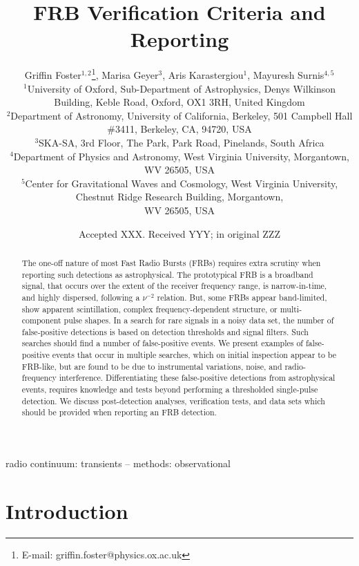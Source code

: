 \documentclass[a4paper,fleqn,usenatbib]{mnras}
\title[FRB Verification Criteria and Reporting]{FRB Verification Criteria and Reporting}
\author[G. Foster et al.]{
Griffin Foster$^{1,2}$\thanks{E-mail: griffin.foster@physics.ox.ac.uk},
Marisa Geyer$^{3}$,
Aris Karastergiou$^{1}$,
Mayuresh Surnis$^{4,5}$
\\
$^{1}$University of Oxford, Sub-Department of Astrophysics, Denys Wilkinson Building, Keble Road, Oxford, OX1 3RH, United Kingdom\\
$^{2}$Department of Astronomy, University of California, Berkeley, 501 Campbell
Hall \#3411, Berkeley, CA, 94720, USA\\
$^{3}$SKA-SA, 3rd Floor, The Park, Park Road, Pinelands, South Africa\\
$^{4}$Department of Physics and Astronomy, West Virginia University, Morgantown, WV 26505, USA\\
$^{5}$Center for Gravitational Waves and Cosmology, West Virginia University, Chestnut Ridge Research Building, Morgantown,\\ WV 26505, USA\\
}
\date{Accepted XXX. Received YYY; in original ZZZ}
\begin{document}
\label{firstpage}
\pagerange{\pageref{firstpage}--\pageref{lastpage}}
\maketitle

\begin{abstract}
The one-off nature of most Fast Radio Bursts (FRBs) requires extra scrutiny when
reporting such detections as astrophysical.  The prototypical FRB is a broadband
signal, that occurs over the extent of the receiver frequency range, is
narrow-in-time, and highly dispersed, following a $\nu^{-2}$ relation.  But,
some FRBs appear band-limited, show apparent scintillation, complex
frequency-dependent structure, or multi-component pulse shapes.  In a search for
rare signals in a noisy data set, the number of false-positive detections is
based on detection thresholds and signal filters.  Such searches should find a
number of false-positive events.  We present examples of false-positive events
that occur in multiple searches, which on initial inspection appear to be
FRB-like, but are found to be due to instrumental variations, noise, and
radio-frequency interference.  Differentiating these false-positive
detections from astrophysical events, requires knowledge and tests beyond
performing a thresholded single-pulse detection.  We discuss post-detection
analyses, verification tests, and data sets which should be provided when
reporting an FRB detection.
\end{abstract}

\begin{keywords}
radio continuum: transients -- methods: observational
\end{keywords}


\section{Introduction}
\label{sec:intro}
\end{document}
